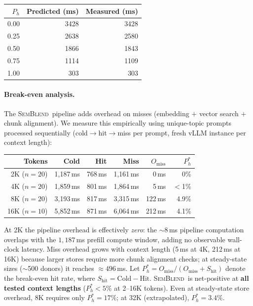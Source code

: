 \documentclass[10pt,twocolumn]{article}
\newcommand{\semblend}{\textsc{SemBlend}\xspace}
\begin{document}
\begin{center}
\small
\begin{tabular}{@{}rrr@{}}
\toprule
$P_h$ & Predicted (ms) & Measured (ms) \\
\midrule
0.00 & 3428 & 3428 \\
0.25 & 2638 & 2580 \\
0.50 & 1866 & 1843 \\
0.75 & 1114 & 1109 \\
1.00 & 303 & 303 \\
\bottomrule
\end{tabular}
\end{center}

\paragraph{Break-even analysis.}
The \semblend\ pipeline adds overhead on misses (embedding $+$ vector search
$+$ chunk alignment). We measure this empirically using unique-topic
prompts processed sequentially (cold$\to$hit$\to$miss per prompt, fresh
vLLM instance per context length):

\smallskip
\begin{center}
\small\setlength{\tabcolsep}{3pt}%
\begin{tabular}{@{}rrrrrr@{}}
\toprule
\textbf{Tokens} & \textbf{Cold} & \textbf{Hit} & \textbf{Miss} & $O_{\mathrm{miss}}$ & $P_h^*$ \\
\midrule
 2K ($n{=}20$) & 1{,}187\,ms & 768\,ms & 1{,}161\,ms & 0\,ms  & 0\% \\
 4K ($n{=}20$) & 1{,}859\,ms & 801\,ms & 1{,}864\,ms & 5\,ms  & $<$1\% \\
 8K ($n{=}20$) & 3{,}193\,ms & 817\,ms & 3{,}315\,ms & 122\,ms & 4.9\% \\
16K ($n{=}10$) & 5{,}852\,ms & 871\,ms & 6{,}064\,ms & 212\,ms & 4.1\% \\
\bottomrule
\end{tabular}
\end{center}
\smallskip

\noindent At 2K the pipeline overhead is effectively \emph{zero}:
the ${\sim}8$\,ms pipeline computation overlaps with the
$1{,}187$\,ms prefill compute window, adding no observable
wall-clock latency. Miss overhead grows
with context length (5\,ms at 4K, 212\,ms at 16K) because larger stores
require more chunk alignment checks; at steady-state sizes ($\sim$500
donors) it reaches ${\approx}496$\,ms.
Let $P_h^* = O_{\mathrm{miss}} / (O_{\mathrm{miss}} + S_{\mathrm{hit}})$
denote the break-even hit rate, where $S_{\mathrm{hit}}{=}\text{Cold}{-}\text{Hit}$.
\semblend\ is net-positive at \textbf{all tested context lengths}
($P_h^*{<}5\%$ at 2--16K tokens).
Even at steady-state store overhead, 8K requires only $P_h^*{=}17\%$;
at 32K (extrapolated), $P_h^*{=}3.4\%$.
\end{document}
